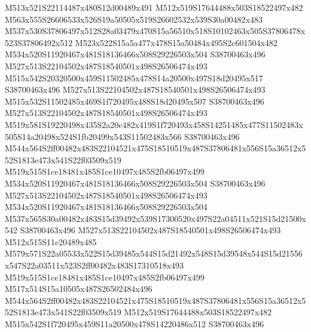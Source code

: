 \documentclass{article}
\begin{document}
\begin{multicols}{2}
M513x521S22114487x480S12d00489x491 M512x519S17644488x503S18522497x482 M563x555S26606533x526S19a50505x519S26602532x539S30a00482x483 M537x530S37806497x512S28a03479x470S15a56510x518S10102463x505S37806478x523S37806492x512 M523x522S15a5a477x478S15a50484x495S2c601504x482 M534x520S11920467x481S18136466x508S29226503x504 S38700463x496 M527x513S22104502x487S18540501x498S26506474x493 M515x542S20320500x459S11502485x478S14a20500x497S18d20495x517 S38700463x496 M527x513S22104502x487S18540501x498S26506474x493 M515x532S11502485x469S1f720495x488S18d20495x507 S38700463x496 M527x513S22104502x487S18540501x498S26506474x493 M519x581S19220498x435S2a20c482x419S1f720493x458S14251485x477S11502483x505S14a20498x524S1fb20499x543S11502483x566 S38700463x496 M544x564S2ff00482x483S22104521x475S18510519x487S37806481x556S15a36512x552S1813e473x541S22f03509x519 M519x515S1ce18481x485S1ce10497x485S2fb06497x499 M534x520S11920467x481S18136466x508S29226503x504 S38700463x496 M527x513S22104502x487S18540501x498S26506474x493 M534x520S11920467x481S18136466x508S29226503x504 M537x565S30a00482x483S15d39492x539S17300520x497S22a04511x521S15d21500x542 S38700463x496 M527x513S22104502x487S18540501x498S26506474x493 M512x515S11e20489x485 M579x571S22a05533x522S15d39485x544S15d21492x548S15d39548x544S15d21556x547S22a03511x523S2ff00482x483S17310518x493 M519x515S1ce18481x485S1ce10497x485S2fb06497x499 M517x514S15a10505x487S26502484x496 M544x564S2ff00482x483S22104521x475S18510519x487S37806481x556S15a36512x552S1813e473x541S22f03509x519 M512x519S17644488x503S18522497x482 M515x542S1f720495x459S11a20500x478S14220486x512 S38700463x496


\end{multicols}
\end{document}
